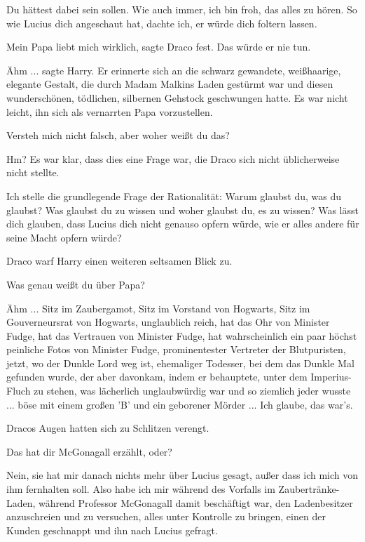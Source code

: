 \glqq{}Du hättest dabei sein sollen. Wie auch immer, ich bin froh, das alles zu
hören. So wie Lucius dich angeschaut hat, dachte ich, er würde dich foltern
lassen.\grqq{}

\glqq{}Mein Papa liebt mich wirklich\grqq{}, sagte Draco fest. \glqq{}Das würde
er nie tun.\grqq{}

\glqq{}Ähm ...\grqq{} sagte Harry. Er erinnerte sich an die schwarz gewandete,
weißhaarige, elegante Gestalt, die durch Madam Malkins Laden gestürmt war und
diesen wunderschönen, tödlichen, silbernen Gehstock geschwungen hatte. Es war
nicht leicht, ihn sich als vernarrten Papa vorzustellen.

\glqq{}Versteh mich nicht falsch, aber woher weißt du das?\grqq{}

\glqq{}Hm?\grqq{} Es war klar, dass dies eine Frage war, die Draco sich nicht
üblicherweise nicht stellte.

\glqq{}Ich stelle die grundlegende Frage der Rationalität: Warum glaubst du, was
du glaubst? Was glaubst du zu wissen und woher glaubst du, es zu wissen? Was
lässt dich glauben, dass Lucius dich nicht genauso opfern würde, wie er alles
andere für seine Macht opfern würde?\grqq{}

Draco warf Harry einen weiteren seltsamen Blick zu.

\glqq{}Was genau weißt du über Papa?\grqq{}

\glqq{}Ähm ... Sitz im Zaubergamot, Sitz im Vorstand von Hogwarts, Sitz im
Gouverneursrat von Hogwarts, unglaublich reich, hat das Ohr von Minister Fudge,
hat das Vertrauen von Minister Fudge, hat wahrscheinlich ein paar höchst
peinliche Fotos von Minister Fudge, prominentester Vertreter der Blutpuristen,
jetzt, wo der Dunkle Lord weg ist, ehemaliger Todesser, bei dem das Dunkle Mal
gefunden wurde, der aber davonkam, indem er behauptete, unter dem Imperius-Fluch
zu stehen, was lächerlich unglaubwürdig war und so ziemlich jeder wusste ... böse
mit einem großen 'B' und ein geborener Mörder ... Ich glaube, das war's.\grqq{}

Dracos Augen hatten sich zu Schlitzen verengt.

\glqq{}Das hat dir McGonagall erzählt, oder?\grqq{}

\glqq{}Nein, sie hat mir danach nichts mehr über Lucius gesagt, außer dass ich
mich von ihm fernhalten soll. Also habe ich mir während des Vorfalls im
Zaubertränke-Laden, während Professor McGonagall damit beschäftigt war, den
Ladenbesitzer anzuschreien und zu versuchen, alles unter Kontrolle zu bringen,
einen der Kunden geschnappt und ihn nach Lucius gefragt.\grqq{}

